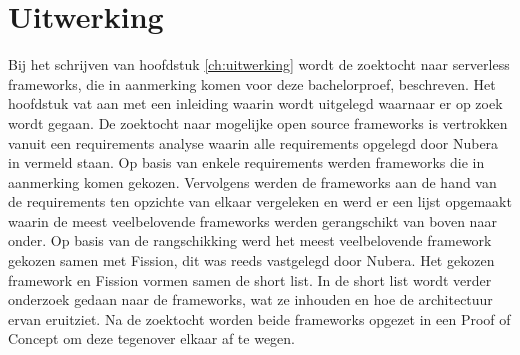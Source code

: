 \section{Uitwerking}
Bij het schrijven van hoofdstuk \ref{ch:uitwerking} wordt de zoektocht naar 
serverless frameworks, die in aanmerking komen voor deze bachelorproef, beschreven. Het hoofdstuk vat aan met een inleiding waarin wordt uitgelegd waarnaar er op zoek wordt gegaan. De zoektocht naar mogelijke open source frameworks is vertrokken vanuit een requirements analyse waarin alle requirements opgelegd door Nubera in vermeld staan. Op basis van enkele requirements werden frameworks die in aanmerking komen gekozen. Vervolgens werden de frameworks aan de hand van de requirements ten opzichte van elkaar vergeleken en werd er een lijst opgemaakt waarin de meest veelbelovende frameworks werden gerangschikt van boven naar onder. Op basis van de rangschikking werd het meest veelbelovende framework gekozen samen met Fission, dit was reeds vastgelegd door Nubera. Het gekozen framework en Fission vormen samen de short list. In de short list wordt verder onderzoek gedaan naar de frameworks, wat ze inhouden en hoe de architectuur ervan eruitziet. Na de zoektocht worden beide frameworks opgezet in een Proof of Concept om deze tegenover elkaar af te wegen.

